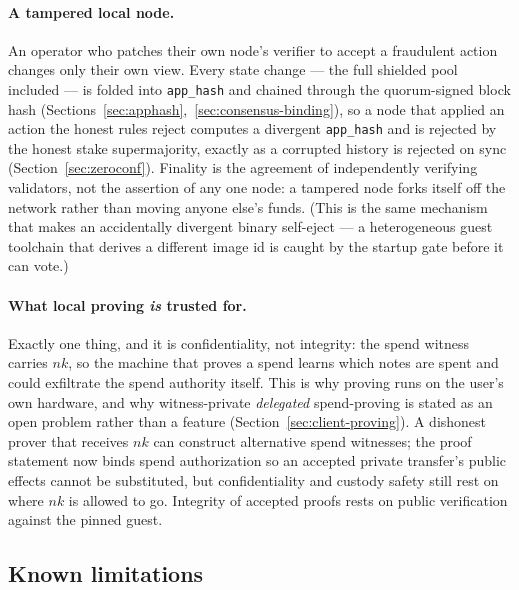 \documentclass[11pt]{article}
\newcommand{\code}[1]{\texttt{#1}}
\theoremstyle{plain}
\theoremstyle{definition}
\theoremstyle{remark}
\begin{document}
\paragraph{A tampered local node.} An operator who patches their own node's
verifier to accept a fraudulent action changes only their own view. Every
state change --- the full shielded pool included --- is folded into
\code{app\_hash} and chained through the quorum-signed block hash
(Sections~\ref{sec:apphash},~\ref{sec:consensus-binding}), so a node that
applied an action the honest rules reject computes a divergent
\code{app\_hash} and is rejected by the honest stake supermajority, exactly as
a corrupted history is rejected on sync (Section~\ref{sec:zeroconf}). Finality
is the agreement of independently verifying validators, not the assertion of
any one node: a tampered node forks itself off the network rather than moving
anyone else's funds. (This is the same mechanism that makes an accidentally
divergent binary self-eject --- a heterogeneous guest toolchain that derives a
different image id is caught by the startup gate before it can vote.)

\paragraph{What local proving \emph{is} trusted for.} Exactly one thing, and
it is confidentiality, not integrity: the spend witness carries $\mathit{nk}$,
so the machine that proves a spend learns which notes are spent and could
exfiltrate the spend authority itself. This is why proving runs on the user's
own hardware, and why witness-private \emph{delegated} spend-proving is stated
as an open problem rather than a feature (Section~\ref{sec:client-proving}).
A dishonest prover that receives $\mathit{nk}$ can construct alternative spend
witnesses; the proof statement now binds spend authorization so an accepted
private transfer's public effects cannot be substituted, but confidentiality
and custody safety still rest on where $\mathit{nk}$ is allowed to go.
Integrity of accepted proofs rests on public verification against the pinned
guest.

\subsection{Known limitations}
\label{sec:limitations}
\end{document}
